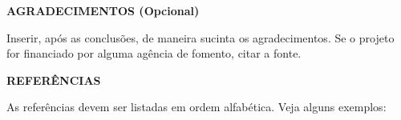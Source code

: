 \documentclass[11pt,a4paper]{article}
\begin{document}
\vspace{1cm}
\noindent
{\fontsize{12}{12}\selectfont
\textbf{AGRADECIMENTOS (Opcional)}}

Inserir, após as conclusões, de maneira sucinta os agradecimentos. Se o projeto for financiado por alguma agência de fomento, citar a fonte.



\vspace{1cm}
\noindent
{\fontsize{12}{12}\selectfont
\textbf{REFERÊNCIAS}}

{\color{red}
As referências devem ser listadas em ordem alfabética. Veja alguns exemplos:}


\begingroup
\renewcommand{\section}[2]{}

\endgroup
\end{document}
